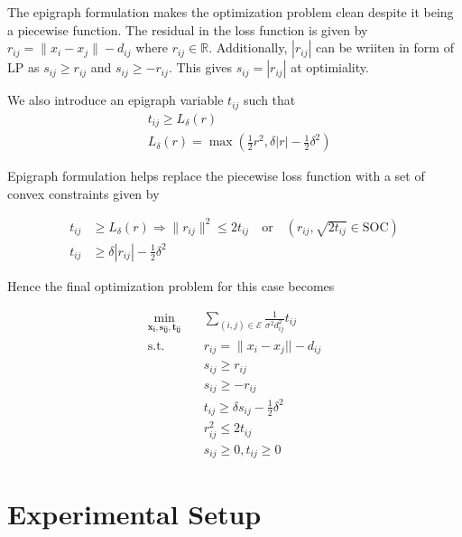 \documentclass[11pt,a4paper]{article}
\begin{document}
The epigraph formulation makes the optimization problem clean despite it being a piecewise function. The residual in the loss function is given by $r_{ij} = \|{x}_i - {x}_j\| - d_{ij}$ where $r_{ij} \in \mathbb{R}$. Additionally, $|r_{ij}|$ can be wriiten in form of LP as $s_{ij}\geq r_{ij}$ and $ s_{ij}\geq -r_{ij}$. This gives $s_{ij}= |r_{ij}|$ at optimiality. 

We also introduce an epigraph variable $t_{ij}$ such that
\begin{align*}
        & t_{ij} \geq L_\delta(r)\\
        & L_\delta(r) = \max \left(\frac{1}{2}r^2,\delta|r|-\frac{1}{2}\delta^2\right)
\end{align*}

Epigraph formulation helps replace the piecewise loss function with a set of convex constraints given by 

\begin{align*}
        t_{ij} & \geq L_\delta(r) \Rightarrow \|r_{ij}\|^2 \leq 2t_{ij} \quad \text{or} \quad   (r_{ij}, \sqrt{2t_{ij}}\in \text{SOC}) \\
        t_{ij} & \geq \delta|r_{ij}|-\frac{1}{2}\delta^2
\end{align*}

Hence the final optimization problem for this case becomes

\begin{equation}
\boxed{
\begin{aligned}
\min_{\mathbf{x_i}, \mathbf{s_{ij}}, \mathbf{t_{ij}}} \quad & \sum_{(i,j) \in \mathcal{E}} \frac{1}{\sigma^2 d_{ij}^2} t_{ij} \\
\text{s.t.} \quad & r_{ij} = \|{x}_i - {x}_j|| - d_{ij} \\
        \quad & s_{ij}\geq r_{ij}  \\
        \quad & s_{ij}\geq -r_{ij} \\
        \quad & t_{ij} \geq \delta s_{ij}-\frac{1}{2}\delta^2 \\
        \quad & r_{ij}^2 \leq 2t_{ij} \\
        \quad & s_{ij} \geq 0, t_{ij} \geq 0
\end{aligned}}
\label{eq:socp_epi}
\end{equation}








\section{Experimental Setup}
\end{document}
